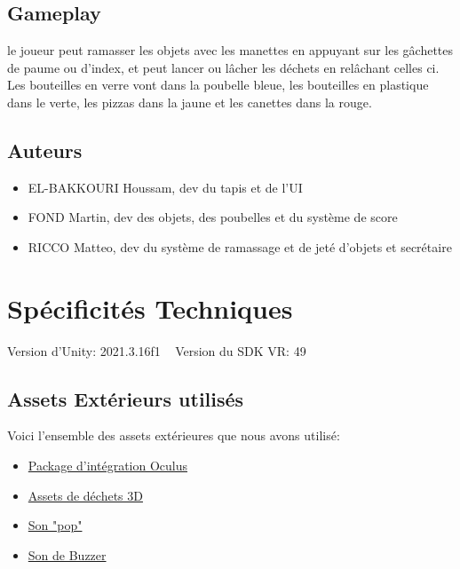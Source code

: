 \documentclass[a4paper,french,12pt]{article}
\begin{document}
\subsection{Gameplay}
le joueur peut ramasser les objets avec les manettes en appuyant sur les gâchettes de paume ou d'index, et peut lancer ou lâcher les déchets en relâchant celles ci.
Les bouteilles en verre vont dans la poubelle bleue, les bouteilles en plastique dans le verte, les pizzas dans la jaune et les canettes dans la rouge.

\subsection{Auteurs}
\begin{itemize}
\item EL-BAKKOURI Houssam, dev du tapis et de l'UI
\item FOND Martin, dev des objets, des poubelles et du système de score
\item RICCO Matteo, dev du système de ramassage et de jeté d'objets et secrétaire
\end{itemize}

\section{Spécificités Techniques}

Version d'Unity: 2021.3.16f1
~
Version du SDK VR: 49
~

\subsection{Assets Extérieurs utilisés}

Voici l'ensemble des assets extérieures que nous avons utilisé:
\begin{itemize}
\item \href{http://https://assetstore.unity.com/packages/tools/integration/oculus-integration-82022}{Package d'intégration Oculus} 

\item \href{https://www.cgtrader.com/free-3d-models/exterior/street-exterior/trashes}{Assets de déchets 3D}


\item \href{https://www.youtube.com/watch?v=7cPTWhj3tng}{Son "pop"}

\item \href{https://www.youtube.com/watch?v=2naim9F4010}{Son de Buzzer}

\end{itemize}
\end{document}
